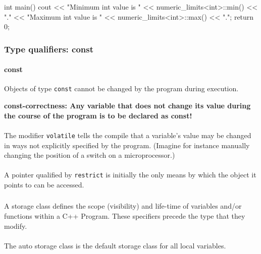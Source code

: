 \documentclass[10pt,a4paper]{scrartcl}
\begin{document}
\begin{multicols*}{2}
\begin{TPCpp}
int main() {
   cout << "Minimum int value is "
        << numeric_limits<int>::min() << ".\n"
        << "Maximum int value is "
        << numeric_limits<int>::max() << ".\n";
   return 0;
}
\end{TPCpp}

\subsubsection{Type qualifiers: const }


\paragraph{const} Objects of type \verb+const+ cannot be changed by the program during execution.

\textbf{const-correctness: Any variable that does not change its value during the course of the program is to be declared as const!}
\paragraph{} The modifier \verb+volatile+ tells the compile that a variable's value may be changed in ways not explicitly specified by the program. (Imagine for instance manually changing the position of a switch on a microprocessor.)
\paragraph{} A pointer qualified by \verb+restrict+ is initially the only means by which the object it points to can be accessed.

\subsubsection{}

A storage class defines the scope (visibility) and life-time of variables and/or functions within a C++ Program. These specifiers precede the type that they modify.

\paragraph{}

The auto storage class is the default storage class for all local variables.

\paragraph{}


\end{multicols*}
\end{document}
